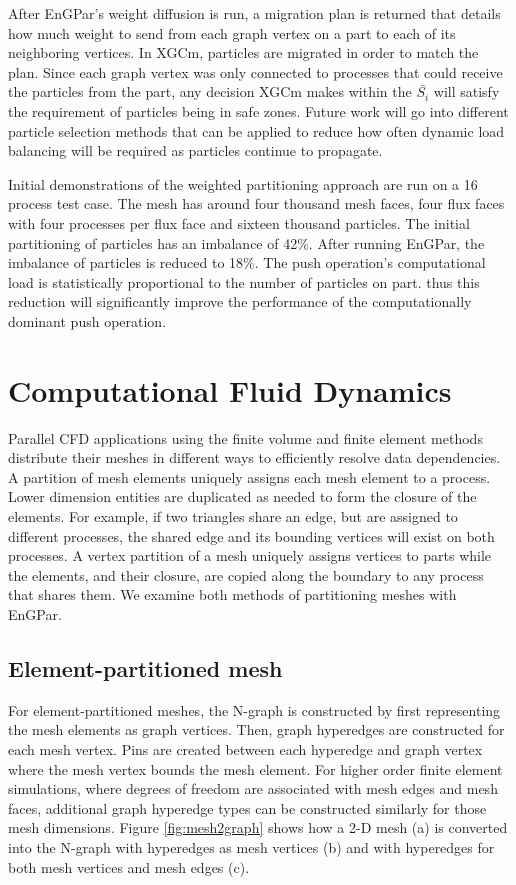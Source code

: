 \documentclass[conference]{IEEEtran}
\begin{document}
After EnGPar's weight diffusion is run, a migration plan is returned that details how
much weight to send from each graph vertex on a part to each of its neighboring vertices.
In XGCm, particles are migrated in order to match the plan. Since each graph vertex was only
connected to processes that could receive the particles from the part, any decision XGCm makes
within the $\bar{S_i}$ will satisfy the requirement of particles being in safe zones. Future work
will go into different particle selection methods that can be applied to reduce how often
dynamic load balancing will be required as particles continue to propagate.

Initial demonstrations of the weighted partitioning approach are run on a 16
process test case. The mesh has around four thousand
mesh faces, four flux faces with four processes per flux face and sixteen thousand particles.
The initial partitioning of particles has an imbalance of 42\%. After running EnGPar, the
imbalance of particles is reduced to 18\%. The push operation's computational load is
statistically proportional to the number of particles on part. thus this
reduction will significantly improve the performance of the computationally
dominant push operation.

\section{Computational Fluid Dynamics} \label{sec:cfd}

Parallel CFD applications using the
finite volume and finite element methods distribute their meshes in different
ways to efficiently resolve data dependencies.
A partition of mesh elements uniquely assigns each mesh element to a process.
Lower dimension entities are duplicated as needed to form the closure of the
elements.
For example, if two triangles share an edge, but are assigned to different
processes, the shared edge and its bounding vertices will exist on both
processes.
A vertex partition of a mesh uniquely assigns vertices to parts while the
elements, and their closure, are copied along the boundary to any process that
shares them.
We examine both methods of partitioning meshes with EnGPar.

\subsection{Element-partitioned mesh}

For element-partitioned meshes, the N-graph is constructed by first representing the mesh elements
as graph vertices. Then, graph hyperedges are constructed for each mesh vertex. Pins
are created between each hyperedge and graph vertex where the mesh vertex bounds the
mesh element. For higher order finite element simulations, where degrees of freedom are
associated with mesh edges and mesh faces, additional graph hyperedge types can be constructed
similarly for those mesh dimensions. Figure \ref{fig:mesh2graph} shows how a 2-D mesh (a)
is converted into the N-graph with hyperedges as mesh vertices (b) and with hyperedges for
both mesh vertices and mesh edges (c).
\end{document}
